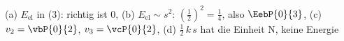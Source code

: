 (a) $E_\mathrm{el}$ in (3): richtig ist $0$, (b) $E_\mathrm{el} \sim s^2$: $\left(\frac{1}{2}\right)^2 = \frac{1}{4}$, also $\EebP{0}{3}$, (c) $v_2 = \vbP{0}{2}$, $v_3 = \vcP{0}{2}$, (d) $\frac{1}{2}\,k\,s$ hat die Einheit N, keine Energie
